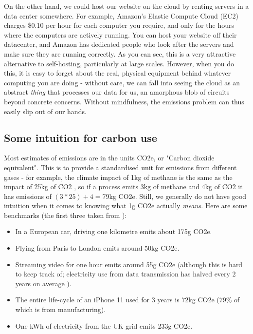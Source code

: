 \documentclass{article}
\begin{document}
On the other hand, we could host our website on the cloud by renting servers in a data center somewhere. For example, Amazon's Elastic Compute Cloud (EC2) charges \$0.10 per hour for each computer you require, and only for the hours where the computers are actively running. You can host your website off their datacenter, and Amazon has dedicated people who look after the servers and make sure they are running correctly. As you can see, this is a very attractive alternative to self-hosting, particularly at large scales. However, when you do this, it is easy to forget about the real, physical equipment behind whatever computing you are doing - without care, we can fall into seeing the cloud as an abstract \emph{thing} that processes our data for us, an amorphous blob of circuits beyond concrete concerns. Without mindfulness, the emissions problem can thus easily slip out of our hands. 


\subsection{Some intuition for carbon use}
Most estimates of emissions are in the units CO2e, or "Carbon dioxide equivalent". This is to provide a standardised unit for emissions from different gases - for example, the climate impact of 1kg of methane is the same as the impact of 25kg of CO2 \citep{forster2007changes}, so if a process emits 3kg of methane and 4kg of CO2 it has emissions of $(3*25)+4=79$kg CO2e. Still, we generally do not have good intuition when it comes to knowing what 1g CO2e actually \emph{means}. Here are some benchmarks (the first three taken from \citet{lannelongue2021ten}):
\begin{itemize}
\item In a European car, driving one kilometre emits about 175g CO2e.
\item Flying from Paris to London emits around 50kg CO2e.
\item Streaming video for one hour emits around 55g CO2e (although this is hard to keep track of; electricity use from data transmission has halved every 2 years on average \citep{aslan2018electricity}).
\item The entire life-cycle of an iPhone 11 used for 3 years is 72kg CO2e (79\% of which is from manufacturing). \citep{apple2019product}
\item One kWh of electricity from the UK grid emits 233g CO2e. \citep{uk2020greenhouse}
\end{itemize}
\end{document}
